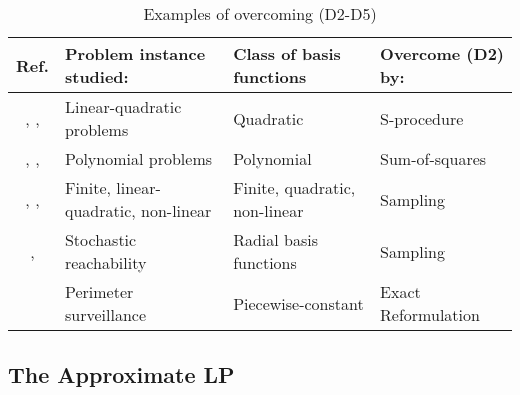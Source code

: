 \documentclass[journal]{IEEEtran}
\begin{document}
\begin{table*} [t] \centering
\caption{Examples of overcoming (D2-D5)}
\vspace{-0.1cm}
\begin{tabular}{|c|l|l|l|}
		\hline
		Ref.		& Problem instance studied:   & Class of basis functions  & Overcome (D2) by:
		\\
		\hline \cite{boyd_iteratedBellman}, \cite{boyd_2011_minmax}, \cite{boyd_2013_iteratedApproxValueFunctions}
		&
		Linear-quadratic problems
		&
		Quadratic
		&
		S-procedure
		\\
		\hline
		\cite{lasserre_2009_soc_via_occupation_measures}, \cite{boyd_iteratedBellman}, \cite{summers_ADPwithSOS}
		&
		Polynomial problems
		&
		Polynomial
		&
		Sum-of-squares
		\\ 
		\hline
		\cite{vanroy_sampDP}, \cite{boyd_2012_quadraticADP}, \cite{sutter_2014_ADPsamp}
		&
		Finite, linear-quadratic, non-linear
		&
		Finite, quadratic, non-linear
		&
		Sampling
		\\
		\hline
		\cite{nikos_2013_ADPforReachability}, \cite{nikos_2015_ADPforReachability_arXiv}
		&
		Stochastic reachability
		&
		Radial basis functions
		&
		Sampling
		\\
		\hline
		\cite{swaroop_2010_pwcValueFunc}
		\cite{swaroop_2011_pwcValueFunc_forPerimeterPatrol}
		&
		Perimeter surveillance
		&
		Piecewise-constant
		&
		Exact Reformulation
		\\
		\hline
		
	\end{tabular}
\vspace{-0.2cm}
\label{tab:D2_D5_reformuation_summary}
\end{table*}









\subsection{The Approximate LP} \label{sec:adp_approxlp}
\end{document}
